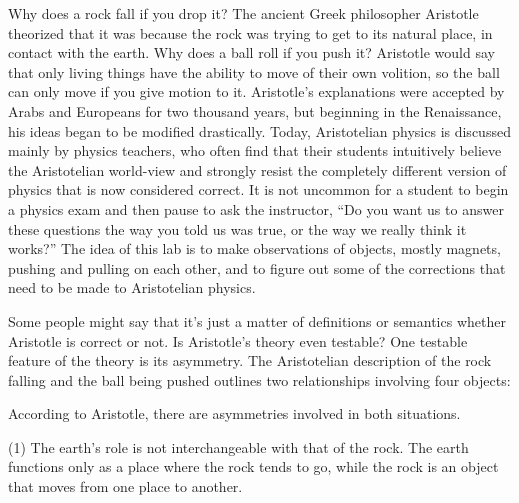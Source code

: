 \label{lab:interactions}

\apparatus
{}


\introduction

Why does a rock fall if you drop it?  The ancient Greek
philosopher Aristotle theorized that it was because the rock
was trying to get to its natural place, in contact with the
earth.  Why does a ball roll if you push it? Aristotle would
say that only living things have the ability to move of
their own volition, so the ball can only move if you give
motion to it.  Aristotle's explanations were accepted by
Arabs and Europeans for two thousand years, but beginning in
the Renaissance, his ideas began to be modified drastically.
 Today, Aristotelian physics is discussed mainly by physics
teachers, who often find that their students intuitively
believe the Aristotelian world-view and strongly resist the
completely different version of physics that is now
considered correct.  It is not uncommon for a student to
begin a physics exam and then pause to ask the instructor,
``Do you want us to answer these questions the way you told
us was true, or the way we really think it works?''  The
idea of this lab is to make observations of objects, mostly
magnets, pushing and pulling on each other, and to figure
out some of the corrections that need to be made to
Aristotelian physics.

Some people might say that it's just a matter of definitions
or semantics whether Aristotle is correct or not.  Is
Aristotle's theory even testable?  One testable feature of
the theory is its asymmetry.  The Aristotelian description
of the rock falling and the ball being pushed outlines two
relationships involving four objects:


According to Aristotle, there are asymmetries involved in both situations.

(1) The earth's role is not interchangeable with that of the
rock.  The earth functions only as a place where the rock
tends to go, while the rock is an object that moves from
one place to another.

